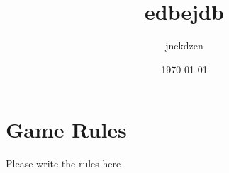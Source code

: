 \documentclass{article}%
\title{edbejdb}%
\author{jnekdzen}%
\date{\today}%
\begin{document}
%
\normalsize%
\maketitle%
\section{Game Rules}%
\label{sec:GameRules}%
Please write the rules here

%
\end{document}
